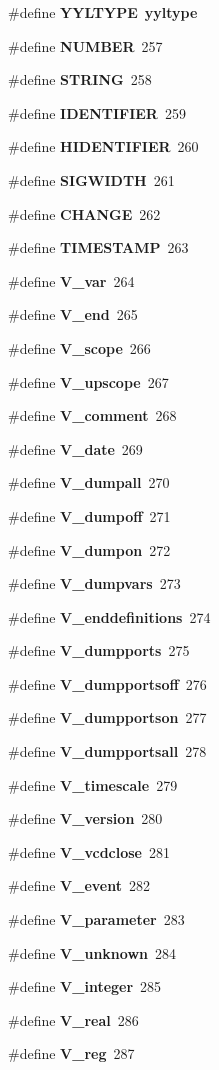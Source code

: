 \begin{CompactItemize}
\item 
\#define {\bf YYLTYPE}\ {\bf yyltype}
\item 
\#define {\bf NUMBER}\ 257
\item 
\#define {\bf STRING}\ 258
\item 
\#define {\bf IDENTIFIER}\ 259
\item 
\#define {\bf HIDENTIFIER}\ 260
\item 
\#define {\bf SIGWIDTH}\ 261
\item 
\#define {\bf CHANGE}\ 262
\item 
\#define {\bf TIMESTAMP}\ 263
\item 
\#define {\bf V\_\-var}\ 264
\item 
\#define {\bf V\_\-end}\ 265
\item 
\#define {\bf V\_\-scope}\ 266
\item 
\#define {\bf V\_\-upscope}\ 267
\item 
\#define {\bf V\_\-comment}\ 268
\item 
\#define {\bf V\_\-date}\ 269
\item 
\#define {\bf V\_\-dumpall}\ 270
\item 
\#define {\bf V\_\-dumpoff}\ 271
\item 
\#define {\bf V\_\-dumpon}\ 272
\item 
\#define {\bf V\_\-dumpvars}\ 273
\item 
\#define {\bf V\_\-enddefinitions}\ 274
\item 
\#define {\bf V\_\-dumpports}\ 275
\item 
\#define {\bf V\_\-dumpportsoff}\ 276
\item 
\#define {\bf V\_\-dumpportson}\ 277
\item 
\#define {\bf V\_\-dumpportsall}\ 278
\item 
\#define {\bf V\_\-timescale}\ 279
\item 
\#define {\bf V\_\-version}\ 280
\item 
\#define {\bf V\_\-vcdclose}\ 281
\item 
\#define {\bf V\_\-event}\ 282
\item 
\#define {\bf V\_\-parameter}\ 283
\item 
\#define {\bf V\_\-unknown}\ 284
\item 
\#define {\bf V\_\-integer}\ 285
\item 
\#define {\bf V\_\-real}\ 286
\item 
\#define {\bf V\_\-reg}\ 287

\end{CompactItemize}
